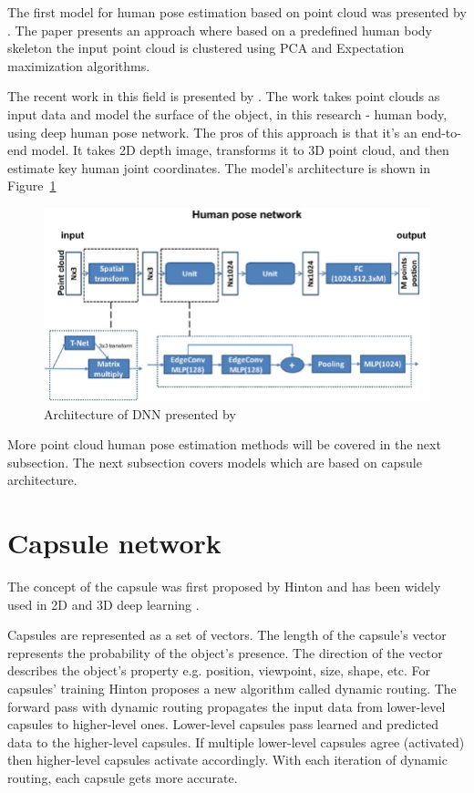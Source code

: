 The first model for human pose estimation based on point cloud was presented by \cite{diaz_barros_real-time_2015}. The paper presents an approach where based on a predefined human body skeleton the input point cloud is clustered using PCA and Expectation maximization algorithms.

The recent work in this field is presented by \cite{zhou_learning_2020}. The work takes point clouds as input data and model the surface of the object, in this research - human body, using deep human pose network. The pros of this approach is that it's an end-to-end model. It takes 2D depth image, transforms it to 3D point cloud, and then estimate key human joint coordinates. The model's architecture is shown in Figure~\ref{img:humreg}

\begin{figure}[htbp]
    \centerline{\includegraphics[scale=0.4]{Figures/human-regression-network.png}}
    \caption{Architecture of DNN presented by \parencite{zhou_learning_2020}}
    \label{img:humreg}
\end{figure}

More point cloud human pose estimation methods will be covered in the next subsection. The next subsection covers models which are based on capsule architecture.

\section{Capsule network}
\label{Capsule network}
The concept of the capsule was first proposed by Hinton \parencite{sabour_dynamic_2017} and has been widely used in 2D and 3D deep learning \parencite{kakillioglu_3d_2020, qin_detecting_2020, duarte_videocapsulenet_2018, lalonde_capsules_2018}.

Capsules are represented as a set of vectors. The length of the capsule's vector represents the probability of the object's presence. The direction of the vector describes the object's property e.g. position, viewpoint, size, shape, etc. For capsules' training Hinton proposes a new algorithm \parencite{sabour_dynamic_2017} called dynamic routing. The forward pass with dynamic routing propagates the input data from lower-level capsules to higher-level ones. Lower-level capsules pass learned and predicted data to the higher-level capsules. If multiple lower-level capsules agree (activated) then higher-level capsules activate accordingly. With each iteration of dynamic routing, each capsule gets more accurate.


